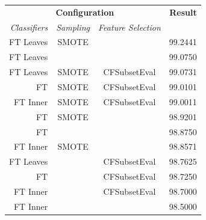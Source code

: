 \begin{table}[htbp]
	\centering
	\begin{tabular}{r c c | r}
		                      \multicolumn{3}{c}{\textbf{Configuration}}                       & \textbf{Result} \\
		\rule[-2ex]{0pt}{4.5ex}\emph{Classifiers} & \emph{Sampling} & \emph{Feature Selection} &  \\ \hline
		         \rule[-2ex]{0pt}{4.5ex}FT Leaves & SMOTE           &                          & 99.2441         \\
		          \rule[-2ex]{0pt}{1ex} FT Leaves &                 &                          & 99.0750         \\
		          \rule[-2ex]{0pt}{1ex} FT Leaves & SMOTE           & CFSubsetEval             & 99.0731         \\
		                  \rule[-2ex]{0pt}{1ex}FT & SMOTE           & CFSubsetEval             & 99.0101         \\
		            \rule[-2ex]{0pt}{1ex}FT Inner & SMOTE           & CFSubsetEval             & 99.0011         \\
		                 \rule[-2ex]{0pt}{1ex} FT & SMOTE           &                          & 98.9201         \\
		                  \rule[-2ex]{0pt}{1ex}FT &                 &                          & 98.8750         \\
		            \rule[-2ex]{0pt}{1ex}FT Inner & SMOTE           &                          & 98.8571         \\
		           \rule[-2ex]{0pt}{1ex}FT Leaves &                 & CFSubsetEval             & 98.7625         \\
		                  \rule[-2ex]{0pt}{1ex}FT &                 & CFSubsetEval             & 98.7250         \\
		            \rule[-2ex]{0pt}{1ex}FT Inner &                 & CFSubsetEval             & 98.7000         \\
		            \rule[-2ex]{0pt}{1ex}FT Inner &                 &                          & 98.5000
	\end{tabular}
\end{table}